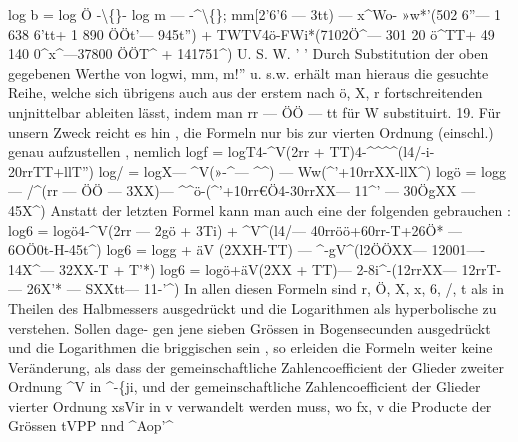 \documentclass[12pt,a4paper]{article}
\begin{document}
log  b  =  log  Ö  -\textbackslash\{\}-  log  m --- -\^{}\textbackslash\{\};  mm[2'6'6 --- 3tt) ---  x\^{}Wo- »w*'(502  6''--- 1  638  6'tt+ 1  890  ÖÖt'--- 945t'') +  TWTV4ö-FWi*(7102Ö\^{}--- 301 20  ö\^{}TT+ 49 140  0\^{}x\^{}---37800  ÖÖT\^{} +  141751\^{}) U.  S.  W.  '  ' Durch  Substitution  der  oben  gegebenen  Werthe  von  logwi,  mm,  m!''  u. s.w. erhält  man  hieraus  die  gesuchte  Reihe,  welche  sich  übrigens  auch  aus  der  erstem nach  ö,  X,  r  fortschreitenden  unjnittelbar  ableiten  lässt,  indem  man  rr --- ÖÖ  ---  tt für  W  substituirt. 19. Für  unsern  Zweck  reicht  es  hin ,  die  Formeln  nur  bis  zur  vierten  Ordnung (einschl.)  genau  aufzustellen ,  nemlich logf  =  logT4-\^{}V(2rr  +  TT)4-\^{}\^{}\^{}\^{}(l4/-i-20rrTT+llT'') log/  =  logX--- \^{}V(»-\^{}--- \^{}\^{})  --- Ww(\^{}'+10rrXX-llX\^{}) logö  =  logg  --- /\^{}(rr  --- ÖÖ  --- 3XX)--- \^{}\^{}ö-(\^{}'+10rr€Ö4-30rrXX--- 11\^{}' ---  30ÖgXX  --- 45X\^{}) Anstatt  der  letzten  Formel  kann  man  auch  eine  der  folgenden  gebrauchen : log6  =  logö4-\^{}V(2rr  --- 2gö  +  3Ti)  +  \^{}V\^{}(l4/--- 40rröö+60rr-T+26Ö* ---  6OÖ0t-H-45t\^{}) log6  =  logg  +  äV  (2XXH-TT)  --- \^{}-gV\^{}(l2ÖÖXX---  12001----  14X\^{}--- 32XX-T  +  T'*) log6  =  logö+äV(2XX  +  TT)--- 2-8i\^{}-(12rrXX---  12rrT-  ---  26X'*  --- SXXtt--- 11-'\^{}) In  allen  diesen  Formeln  sind  r,  Ö,  X,  x,  6,  /,  t  als  in  Theilen  des  Halbmessers ausgedrückt  und  die  Logarithmen  als  hyperbolische  zu  verstehen.  Sollen  dage- gen jene  sieben  Grössen  in  Bogensecunden  ausgedrückt  und  die  Logarithmen  die briggischen  sein ,  so  erleiden  die  Formeln  weiter  keine  Veränderung,  als  dass  der gemeinschaftliche  Zahlencoefficient  der  Glieder  zweiter  Ordnung  \^{}V  in  \^{}-\{ji,  und der  gemeinschaftliche  Zahlencoefficient  der  Glieder  vierter  Ordnung  xsVir  in  v verwandelt  werden  muss,  wo    fx,  v    die  Producte  der  Grössen  tVPP  nnd  \^{}Aop'\^{}
\end{document}
